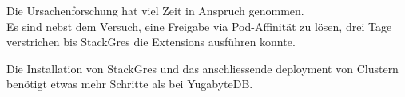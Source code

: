 \begin{flushleft}
    Die Ursachenforschung hat viel Zeit in Anspruch genommen.\\
    Es sind nebst dem Versuch, eine Freigabe via Pod-Affinität zu lösen, drei Tage verstrichen bis StackGres die Extensions ausführen konnte.
\end{flushleft}
\begin{flushleft}
    Die Installation von StackGres und das anschliessende deployment von Clustern benötigt etwas mehr Schritte als bei YugabyteDB.
\end{flushleft}